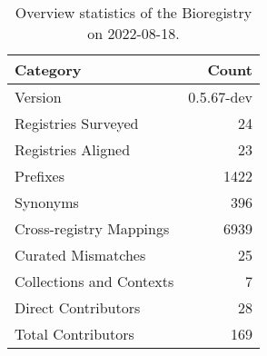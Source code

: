 \begin{table}
\centering
\caption{Overview statistics of the Bioregistry on 2022-08-18.}
\label{tab:bioregistry-summary}
\begin{tabular}{lr}
\toprule
                Category &      Count \\
\midrule
                 Version & 0.5.67-dev \\
     Registries Surveyed &         24 \\
      Registries Aligned &         23 \\
                Prefixes &       1422 \\
                Synonyms &        396 \\
 Cross-registry Mappings &       6939 \\
      Curated Mismatches &         25 \\
Collections and Contexts &          7 \\
     Direct Contributors &         28 \\
      Total Contributors &        169 \\
\bottomrule
\end{tabular}
\end{table}
